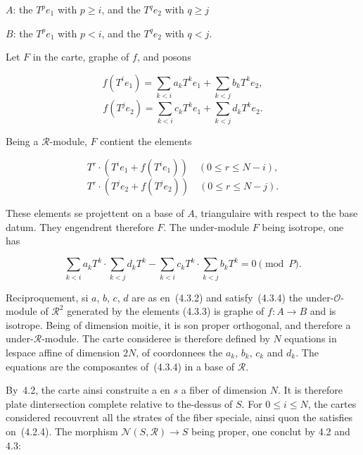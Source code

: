 \documentclass[11pt,a4paper]{article}
\theoremstyle{plain}
\theoremstyle{definition}
\begin{document}
$A$: the $T^p e_1$ with $p \geq i$, and the $T^q e_2$ with $q \geq j$

$B$: the $T^p e_1$ with $p < i$, and the $T^q e_2$ with $q < j$.

Let $F$ in the carte, graphe of $f$, and posons

\begin{equation}
f(T^i e_1) = \sum_{k < i} a_k T^k e_1 + \sum_{k < j} b_k T^k e_2,
\end{equation}
\begin{equation}
f(T^j e_2) = \sum_{k < i} c_k T^k e_1 + \sum_{k < j} d_k T^k e_2.
\end{equation}

Being a $\mathscr{R}$-module, $F$ contient the elements

\begin{equation}
T^r \cdot (T^i e_1 + f(T^i e_1)) \quad (0 \leq r \leq N - i),
\end{equation}
\begin{equation}
T^r \cdot (T^j e_2 + f(T^j e_2)) \quad (0 \leq r \leq N - j).
\end{equation}

These elements se projettent on a base of $A$, triangulaire with respect to the base
datum. They engendrent therefore $F$. The under-module $F$ being isotrope, one has

\begin{equation}
\sum_{k < i} a_k T^k \cdot \sum_{k < j} d_k T^k - \sum_{k < i} c_k T^k \cdot \sum_{k < j} b_k T^k = 0 \pmod{P}.
\end{equation}

Reciproquement, si $a$, $b$, $c$, $d$ are as en~(4.3.2) and satisfy~(4.3.4) the
under-$\mathscr{O}$-module of $\mathscr{R}^2$ generated by the elements (4.3.3) is graphe of $f: A \to B$
and is isotrope. Being of dimension moitie, it is son proper orthogonal, and therefore
a under-$\mathscr{R}$-module. The carte consideree is therefore defined by $N$ equations in
lespace affine of dimension $2N$, of coordonnees the $a_k$, $b_k$, $c_k$ and $d_k$. The
equations are the composantes of~(4.3.4) in a base of $\mathscr{R}$.

By~4.2, the carte ainsi construite a en $s$ a fiber of dimension $N$. It is
therefore plate dintersection complete relative to the-dessus of $S$. For $0 \leq i \leq N$, the
cartes considered recouvrent all the strates of the fiber speciale, ainsi quon
the satisfies on~(4.2.4). The morphism $\mathscr{N}(S, \mathscr{R}) \to S$ being proper, one conclut by
4.2 and 4.3:
\end{document}
